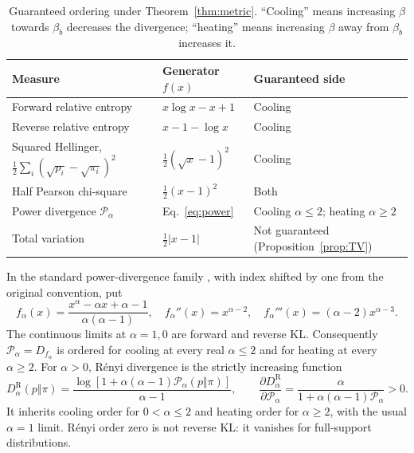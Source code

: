 \documentclass[11pt,a4paper]{article}
\theoremstyle{remark}\newtheorem{remark}[theorem]{Remark}
\begin{document}
\begin{table}[tb]
\centering\small
\caption{Guaranteed ordering under Theorem~\ref{thm:metric}. ``Cooling'' means increasing $\beta$ towards $\beta_b$ decreases the divergence; ``heating'' means increasing $\beta$ away from $\beta_b$ increases it.}
\label{tab:metrics}
\begin{tabular}{>{\raggedright\arraybackslash}p{.32\linewidth}>{\raggedright\arraybackslash}p{.38\linewidth}>{\raggedright\arraybackslash}p{.19\linewidth}}
\toprule Measure & Generator $f(x)$ & Guaranteed side\\\midrule
Forward relative entropy & $x\log x-x+1$ & Cooling\\
Reverse relative entropy & $x-1-\log x$ & Cooling\\
Squared Hellinger, $\frac12\sum_i(\sqrt{p_i}-\sqrt{\pi_i})^2$ & $\frac12(\sqrt x-1)^2$ & Cooling\\
Half Pearson chi-square & $\frac12(x-1)^2$ & Both\\
Power divergence $\mathcal P_\alpha$ & Eq.~\eqref{eq:power} & Cooling $\alpha\le2$; heating $\alpha\ge2$\\
Total variation & $\frac12|x-1|$ & Not guaranteed (Proposition~\ref{prop:TV})\\
\bottomrule
\end{tabular}
\end{table}

In the standard power-divergence family \cite{Cressie1984}, with index shifted by one from the original convention, put
\begin{equation}
 f_\alpha(x)=\frac{x^\alpha-\alpha x+\alpha-1}{\alpha(\alpha-1)},
 \quad f_\alpha''(x)=x^{\alpha-2},\quad
 f_\alpha'''(x)=(\alpha-2)x^{\alpha-3}.
 \label{eq:power}
\end{equation}
The continuous limits at $\alpha=1,0$ are forward and reverse KL. Consequently $\mathcal P_\alpha=D_{f_\alpha}$ is ordered for cooling at every real $\alpha\le2$ and for heating at every $\alpha\ge2$. For $\alpha>0$, R\'enyi divergence is the strictly increasing function
\begin{equation}
 D_\alpha^{\mathrm R}(p\Vert\pi)
 =\frac{\log[1+\alpha(\alpha-1)\mathcal P_\alpha(p\Vert\pi)]}{\alpha-1},
 \qquad
 \frac{\partial D_\alpha^{\mathrm R}}{\partial\mathcal P_\alpha}
 =\frac{\alpha}{1+\alpha(\alpha-1)\mathcal P_\alpha}>0.
 \label{eq:renyi}
\end{equation}
It inherits cooling order for $0<\alpha\le2$ and heating order for $\alpha\ge2$, with the usual $\alpha=1$ limit. R\'enyi order zero is not reverse KL: it vanishes for full-support distributions.
\end{document}
